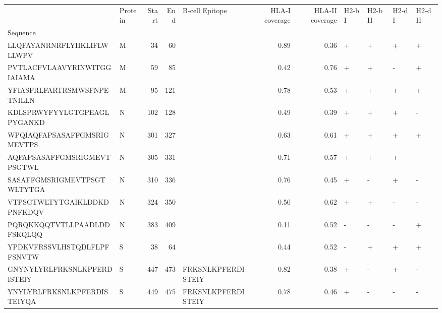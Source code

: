 \begin{tabular}{llrrlrrllll}
\toprule
{} & Protein &  Start &   End &      B-cell Epitope &  HLA-I coverage &  HLA-II coverage & H2-b I & H2-b II & H2-d I & H2-d II \\
Sequence                    &         &        &       &                     &                 &                  &        &         &        &         \\
\midrule
LLQFAYANRNRFLYIIKLIFLWLLWPV &       M &     34 &    60 &                     &            0.89 &             0.36 &      + &       + &      + &       + \\
PVTLACFVLAAVYRINWITGGIAIAMA &       M &     59 &    85 &                     &            0.42 &             0.76 &      + &       + &      - &       + \\
YFIASFRLFARTRSMWSFNPETNILLN &       M &     95 &   121 &                     &            0.78 &             0.53 &      + &       + &      + &       + \\
KDLSPRWYFYYLGTGPEAGLPYGANKD &       N &    102 &   128 &                     &            0.49 &             0.39 &      + &       + &      + &       - \\
WPQIAQFAPSASAFFGMSRIGMEVTPS &       N &    301 &   327 &                     &            0.63 &             0.61 &      + &       + &      + &       + \\
AQFAPSASAFFGMSRIGMEVTPSGTWL &       N &    305 &   331 &                     &            0.71 &             0.57 &      + &       + &      + &       - \\
SASAFFGMSRIGMEVTPSGTWLTYTGA &       N &    310 &   336 &                     &            0.76 &             0.45 &      + &       - &      + &       - \\
VTPSGTWLTYTGAIKLDDKDPNFKDQV &       N &    324 &   350 &                     &            0.50 &             0.62 &      + &       + &      - &       - \\
PQRQKKQQTVTLLPAADLDDFSKQLQQ &       N &    383 &   409 &                     &            0.11 &             0.52 &      - &       - &      - &       + \\
YPDKVFRSSVLHSTQDLFLPFFSNVTW &       S &     38 &    64 &                     &            0.44 &             0.52 &      - &       + &      + &       + \\
GNYNYLYRLFRKSNLKPFERDISTEIY &       S &    447 &   473 &  FRKSNLKPFERDISTEIY &            0.82 &             0.38 &      + &       - &      + &       - \\
YNYLYRLFRKSNLKPFERDISTEIYQA &       S &    449 &   475 &  FRKSNLKPFERDISTEIY &            0.78 &             0.46 &      + &       - &      - &       - \\

\end{tabular}
